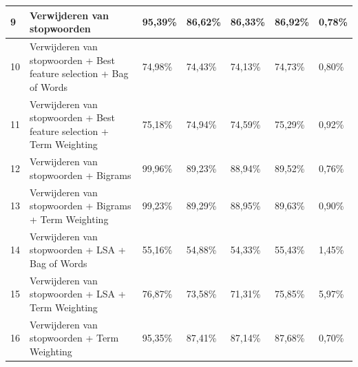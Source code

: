 \begin{table}
\begin{adjustbox}{width=1\textwidth}
\begin{tabular}{|l|l|l|l|l|l|l|}
9        & Verwijderen van stopwoorden                                                      & 95,39\%                     & 86,62\%                & 86,33\%                 & 86,92\%                  & 0,78\%      \\ \hline
10       & Verwijderen van stopwoorden + Best feature selection + Bag of Words   & 74,98\%                     & 74,43\%                & 74,13\%                 & 74,73\%                  & 0,80\%      \\ \hline
11       & Verwijderen van stopwoorden + Best feature selection + Term Weighting & 75,18\%                     & 74,94\%                & 74,59\%                 & 75,29\%                  & 0,92\%      \\ \hline
12       & Verwijderen van stopwoorden + Bigrams                                            & 99,96\%                     & 89,23\%                & 88,94\%                 & 89,52\%                  & 0,76\%      \\ \hline
13       & Verwijderen van stopwoorden + Bigrams + Term Weighting                           & 99,23\%                     & 89,29\%                & 88,95\%                 & 89,63\%                  & 0,90\%      \\ \hline
14       & Verwijderen van stopwoorden + LSA + Bag of Words                                 & 55,16\%                     & 54,88\%                & 54,33\%                 & 55,43\%                  & 1,45\%      \\ \hline
15       & Verwijderen van stopwoorden + LSA + Term Weighting                               & 76,87\%                     & 73,58\%                & 71,31\%                 & 75,85\%                  & 5,97\%      \\ \hline
16       & Verwijderen van stopwoorden + Term Weighting                                     & 95,35\%                     & 87,41\%                & 87,14\%                 & 87,68\%                  & 0,70\%      \\ \hline
\end{tabular}
\end{adjustbox}
\end{table}

